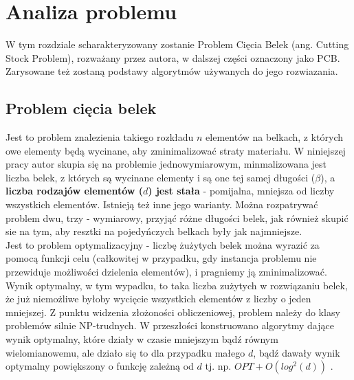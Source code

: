 \chapter{Analiza problemu}
\thispagestyle{chapterBeginStyle}

W tym rozdziale scharakteryzowany zostanie Problem Cięcia Belek (ang. Cutting Stock Problem), rozważany przez autora, w dalszej części oznaczony jako PCB.
Zarysowane też zostaną podstawy algorytmów używanych do jego rozwiazania.

\section{Problem cięcia belek}
Jest to problem znalezienia takiego rozkładu $n$ elementów na belkach, z których owe elementy będą wycinane, aby zminimalizować straty materiału.  W niniejszej pracy autor skupia się na problemie jednowymiarowym, minmalizowana jest liczba belek, z których są wycinane elementy i są one tej samej długości ($\beta$), a \textbf{liczba rodzajów elementów ($d$) jest stała} - pomijalna, mniejsza od liczby wszystkich elementów. Istnieją też inne jego warianty. Można rozpatrywać problem dwu, trzy - wymiarowy, przyjąć różne długości belek, jak również skupić sie na tym, aby resztki na pojedyńczych belkach były jak najmniejsze.\\
Jest to problem optymalizacyjny - liczbę żużytych belek można wyrazić za pomocą funkcji celu (całkowitej w przypadku, gdy instancja problemu nie przewiduje możliwości dzielenia elementów), i pragniemy ją zminimalizować.
Wynik optymalny, w tym wypadku, to taka liczba zużytych w rozwiązaniu belek, że już niemożliwe byłoby wycięcie wszystkich elementów z liczby o jeden mniejszej.
Z punktu widzenia złożoności obliczeniowej, problem należy do klasy problemów silnie NP-trudnych. W przeszłości konstruowano algorytmy dające wynik optymalny, które działy w czasie mniejszym bądź równym wielomianowemu, ale działo się to dla przypadku małego $d$, bądź dawały wynik optymalny powiększony o funkcję zależną od $d$ tj. np. $OPT + O(log^2(d))$  \cite{ALG_OPT_1}.

